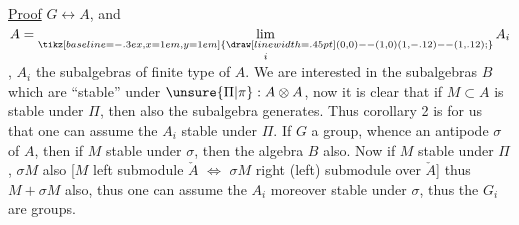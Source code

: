 \uline{Proof} $G\longleftrightarrow A$,  and $A=\underset{i}{\underset{\mathrel{\tikz[baseline=-.3ex,x=1em,y=1em]{\draw[line width=.45pt] (0,0)--(1,0) (1,-.12)--(1,.12);}}}{\mathrm{lim}}}\,A_i$, $A_i$ the subalgebras of finite type of $A$. We are interested in the subalgebras $B$ which are ``stable'' under $\unsure{\Pi|\pi}:A\otimes A$, now it is clear that if
$M\subset A$ is stable under $\Pi$, then also the subalgebra  generates. Thus corollary 2 is for us that one can assume the $A_i$ stable under $\Pi$. If $G$ a group, whence an antipode
$\sigma$ of $A$, then if $M$ stable under $\sigma$, then the algebra $B$ also. Now if $M$ stable under $\Pi$, $\sigma M$ also [$M$ left submodule  $\check A$ $\Longleftrightarrow$ $\sigma M$ right (left) submodule over $\check A$] thus $M+\sigma M$ also, thus one can assume the $A_i$ moreover stable under $\sigma$, thus the $G_i$ are groups.

